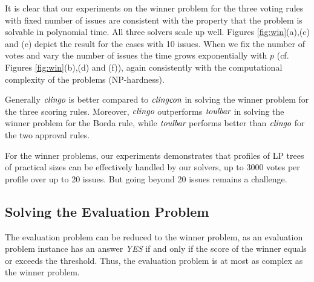 It is clear that our experiments on the winner problem for the three voting rules with 
fixed number of issues are consistent with the property that the problem
is solvable in polynomial time. All three solvers scale up well.
Figures \ref{fig:win}(a),(c) and (e) depict the result for the cases with 10 issues.
When we fix the number of votes and vary the number of 
issues the time grows exponentially with $p$ (cf. Figures \ref{fig:win}(b),(d) and (f)),
again consistently with the computational complexity of the problems (NP-hardness).

Generally $\textit{clingo}$ is better compared to $\textit{clingcon}$ in solving 
the winner problem for the three scoring rules. Moreover,
$\textit{clingo}$ outperforms $\textit{toulbar}$ in solving the winner problem for
the Borda rule, while $\textit{toulbar}$ performs better than $\textit{clingo}$
for the two approval rules.

For the winner problems, our experiments demonstrates that profiles
of LP trees of practical sizes can be effectively handled by our
solvers, up to 3000 votes per profile over up to 20 issues.
But going beyond 20 issues remains a challenge.





\subsection{Solving the Evaluation Problem}
The evaluation problem can be reduced to the winner problem, as
an evaluation problem instance has an answer \textit{YES}
if and only if the score of the winner equals or exceeds the threshold.
Thus, the evaluation problem is at most as complex as
the winner problem.

